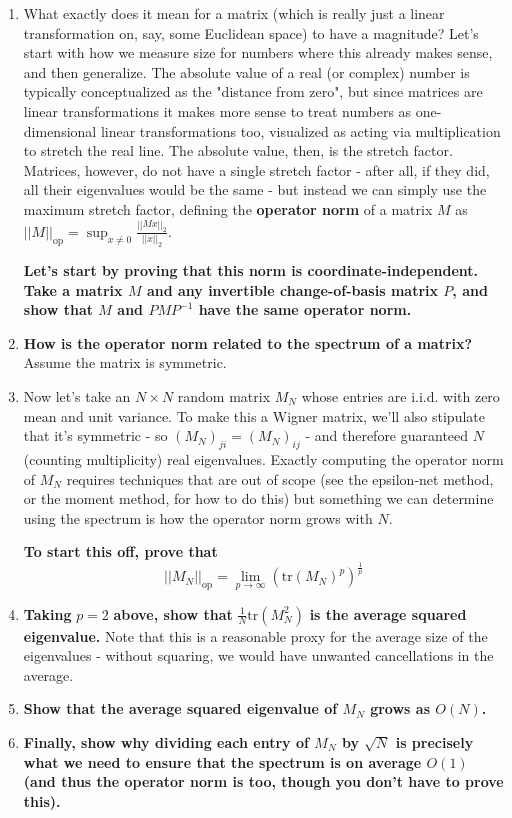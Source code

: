 \documentclass[a4paper]{article}
\begin{document}
\begin{enumerate}
    \item What exactly does it mean for a matrix (which is really just a linear transformation on, say, some Euclidean space) to have a magnitude? Let's start with how we measure size for numbers where this already makes sense, and then generalize. The absolute value of a real (or complex) number is typically conceptualized as the "distance from zero", but since matrices are linear transformations it makes more sense to treat numbers as one-dimensional linear transformations too, visualized as acting via multiplication to stretch the real line. The absolute value, then, is the stretch factor. Matrices, however, do not have a single stretch factor - after all, if they did, all their eigenvalues would be the same - but instead we can simply use the maximum stretch factor, defining the \textbf{operator norm} of a matrix $ M $ as $ || M ||_\text{op} = \sup_{x \neq 0} \frac{|| M x ||_2}{|| x ||_2} $.
    
    \textbf{Let's start by proving that this norm is coordinate-independent. Take a matrix $ M $ and any invertible change-of-basis matrix $ P $, and show that $ M $ and $ P M P^{-1} $ have the same operator norm.}
    
    \item \textbf{How is the operator norm related to the spectrum of a matrix?} Assume the matrix is symmetric.
    
    \item Now let's take an $ N \times N $ random matrix $ M_N $ whose entries are i.i.d. with zero mean and unit variance. To make this a Wigner matrix, we'll also stipulate that it's symmetric - so $ (M_N)_{ji} = (M_N)_{ij} $ - and therefore guaranteed $ N $ (counting multiplicity) real eigenvalues. Exactly computing the operator norm of $ M_N $ requires techniques that are out of scope (see the epsilon-net method, or the moment method, for how to do this) but something we can determine using the spectrum is how the operator norm grows with $ N $.
    
    \textbf{To start this off, prove that}
    $$ || M_N ||_\text{op} = \lim_{p \to \infty} \left( \text{tr}(M_N)^p \right)^\frac{1}{p} $$
    
    \item \textbf{Taking } $ p = 2 $ \textbf{above, show that } $ \frac{1}{N} \text{tr}(M_N^2) $ \textbf{is the average squared eigenvalue.} Note that this is a reasonable proxy for the average size of the eigenvalues - without squaring, we would have unwanted cancellations in the average.
    
    \item \textbf{Show that the average squared eigenvalue of $ M_N $ grows as $ O(N) $.}
    
    \item \textbf{Finally, show why dividing each entry of $ M_N $ by $ \sqrt{N} $ is precisely what we need to ensure that the spectrum is on average $ O(1) $ (and thus the operator norm is too, though you don't have to prove this).}
    
\end{enumerate}
\end{document}
